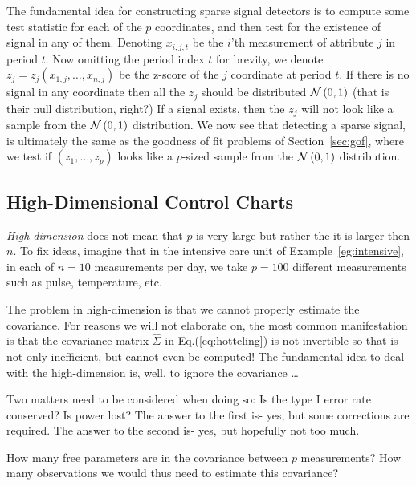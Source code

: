\begin{extra}

The fundamental idea for constructing sparse signal detectors is to compute some test statistic for each of the $p$ coordinates, and then test for the existence of signal in any of them. 
Denoting $x_{i,j,t}$ be the $i$'th measurement of attribute $j$ in period $t$.
Now omitting the period index $t$ for brevity, we denote $z_j=z_j(x_{1,j},\dots,x_{n,j})$ be the z-score of the $j$ coordinate at period $t$. 
If there is no signal in any coordinate then all the $z_j$ should be distributed $\mathcal{N}\left(0,1\right)$ (that is their null distribution, right?)
If a signal exists, then the $z_j$ will not look like a sample from the $\mathcal{N}\left(0,1\right)$ distribution. 
We now see that detecting a sparse signal, is ultimately the same as the goodness of fit problems of Section~\ref{sec:gof}, where we test if $(z_1,\dots,z_p)$ looks like a $p$-sized sample from the $\mathcal{N}\left(0,1\right)$ distribution.

\end{extra}





\subsection{High-Dimensional Control Charts}

\emph{High dimension} does not mean that $p$ is very large but rather the it is larger then $n$.
To fix ideas, imagine that in the intensive care unit of Example~\ref{eg:intensive}, in each of $n=10$ measurements per day, we take $p=100$ different measurements such as pulse, temperature, etc.


The problem in high-dimension is that we cannot properly estimate the covariance. 
For reasons we will not elaborate on, the most common manifestation is that the covariance matrix $\hat{\Sigma}$ in Eq.(\ref{eq:hotteling}) is not invertible so that \tsq is not only inefficient, but cannot even be computed!
The fundamental idea to deal with the high-dimension is, well, to ignore the covariance \dots

Two matters need to be considered when doing so:
Is the type I error rate conserved?
Is power lost?
The answer to the first is- yes, but some corrections are required.
The answer to the second is- yes, but hopefully not too much.

\begin{think}
How many free parameters are in the covariance between $p$ measurements?
How many observations we would thus need to estimate this covariance?
\end{think} 



